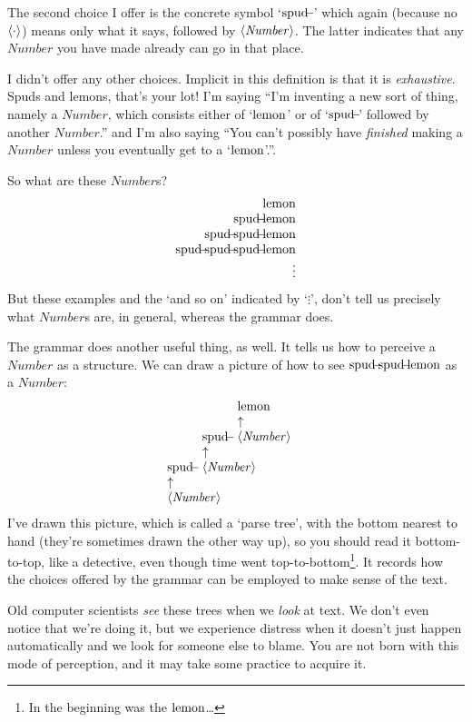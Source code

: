 \documentclass{book}
\begin{document}
The second choice I offer is the concrete symbol `$\mbox{spud}\!\!\!-\!\!\!{\,}$' which again (because no $\langle\mathit{\cdot}\rangle$) means only what it says, followed by $\langle\mathit{Number}\rangle$. The latter indicates that any $\mathit{Number}$ you have made already can go in that place.

I didn't offer any other choices. Implicit in this definition is that it is \emph{exhaustive}. Spuds and lemons, that's your lot! I'm saying ``I'm inventing a new sort of thing, namely a $\mathit{Number}$, which consists either of `$\mbox{lemon}$' or of `$\mbox{spud}\!\!\!-\!\!\!{}$' followed by another $\mathit{Number}$.'' and I'm also saying ``You can't possibly have \emph{finished} making a $\mathit{Number}$ unless you eventually get to a `$\mbox{lemon}$'.''.

So what are these $\mathit{Number}$s?
\[\begin{array}{r}
\lemon \\
\spud\lemon \\
\spud\spud\lemon \\
\spud\spud\spud\lemon \\
\vdots
\end{array}\]
But these examples and the `and so on' indicated by `$\vdots$', don't tell us precisely what $\mathit{Number}$s are, in general, whereas the grammar does.

\newcommand{\nta}[2]{\begin{array}[b]{l} #2\\ \uparrow\\ \nt{#1}\end{array}}
The grammar does another useful thing, as well. It tells us how to perceive a $\mathit{Number}$ as a structure. We can draw a picture of how to see $\spud\spud\lemon$ as a $\mathit{Number}$:
\[\nta{Number}{\spud\nta{Number}{\spud\nta{Number}{\lemon}}}\]
I've drawn this picture, which is called a `parse tree', with the bottom nearest to hand (they're sometimes drawn the other way up), so you should read it bottom-to-top, like a detective, even though time went top-to-bottom\footnote{In the beginning was the $\mbox{lemon}$\ldots}. It records how the choices offered by the grammar can be employed to make sense of the text.

Old computer scientists \emph{see} these trees when we \emph{look} at text. We don't even notice that we're doing it, but we experience distress when it doesn't just happen automatically and we look for someone else to blame. You are not born with this mode of perception, and it may take some practice to acquire it.
\end{document}
